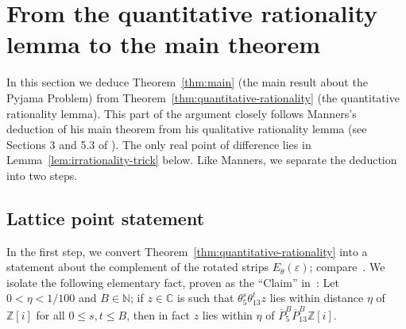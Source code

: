 \documentclass[11pt]{amsart}
\theoremstyle{definition}
\DeclareMathOperator{\sm}{s-m}
\newcommand{\Csm}{C_{\sm}}
\begin{document}



\section{From the quantitative rationality lemma to the main theorem}\label{s:irrationalargument}

In this section we deduce Theorem~\ref{thm:main} (the main result about the Pyjama Problem) from Theorem~\ref{thm:quantitative-rationality} (the quantitative rationality lemma).  This part of the argument closely follows Manners's deduction of his main theorem from his qualitative rationality lemma (see Sections 3 and 5.3 of \cite{Man13}).  The only real point of difference lies in Lemma~\ref{lem:irrationality-trick} below.  Like Manners, we separate the deduction into two steps.

\subsection{Lattice point statement}
In the first step, we convert Theorem~\ref{thm:quantitative-rationality} into a statement about the complement of the rotated strips $E_\theta(\varepsilon)$; compare~\cite[Lemma 3.1]{Man13}.  We isolate the following elementary fact, proven as the ``Claim'' in~\cite[page 251]{Man13}: Let $0<\eta<1/100$ and $B \in \mathbb{N}$; if $z \in \mathbb{C}$ is such that $\theta_5^s\theta_{13}^tz$ lies within distance $\eta$ of $\mathbb{Z}[i]$ for all $0 \leq s,t \leq B$, then in fact $z$ lies within $\eta$ of $\overline{P}_5^B \overline{P}_{13}^B \mathbb{Z}[i]$.  
\end{document}
